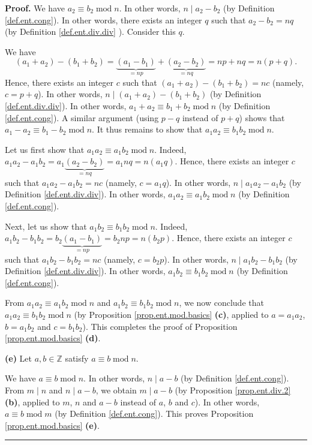 \documentclass[numbers=enddot,12pt,final,onecolumn,notitlepage]{scrartcl}%
\numberwithin{exer}{subsection}
\theoremstyle{definition}
\newenvironment{proof}[1][Proof]{\noindent\textbf{#1.} }{\ \rule{0.5em}{0.5em}}
\begin{document}
\begin{proof}
We have $a_{2}\equiv b_{2}\operatorname{mod}n$. In other words, $n\mid
a_{2}-b_{2}$ (by Definition \ref{def.ent.cong}). In other words, there exists
an integer $q$ such that $a_{2}-b_{2}=nq$ (by Definition \ref{def.ent.div.div}%
). Consider this $q$.

We have%
\[
\left(  a_{1}+a_{2}\right)  -\left(  b_{1}+b_{2}\right)  =\underbrace{\left(
a_{1}-b_{1}\right)  }_{=np}+\underbrace{\left(  a_{2}-b_{2}\right)  }%
_{=nq}=np+nq=n\left(  p+q\right)  .
\]
Hence, there exists an integer $c$ such that $\left(  a_{1}+a_{2}\right)
-\left(  b_{1}+b_{2}\right)  =nc$ (namely, $c=p+q$). In other words,
$n\mid\left(  a_{1}+a_{2}\right)  -\left(  b_{1}+b_{2}\right)  $ (by
Definition \ref{def.ent.div.div}). In other words, $a_{1}+a_{2}\equiv
b_{1}+b_{2}\operatorname{mod}n$ (by Definition \ref{def.ent.cong}). A similar
argument (using $p-q$ instead of $p+q$) shows that $a_{1}-a_{2}\equiv
b_{1}-b_{2}\operatorname{mod}n$. It thus remains to show that $a_{1}%
a_{2}\equiv b_{1}b_{2}\operatorname{mod}n$.

Let us first show that $a_{1}a_{2}\equiv a_{1}b_{2}\operatorname{mod}n$.
Indeed, $a_{1}a_{2}-a_{1}b_{2}=a_{1}\underbrace{\left(  a_{2}-b_{2}\right)
}_{=nq}=a_{1}nq=n\left(  a_{1}q\right)  $. Hence, there exists an integer $c$
such that $a_{1}a_{2}-a_{1}b_{2}=nc$ (namely, $c=a_{1}q$). In other words,
$n\mid a_{1}a_{2}-a_{1}b_{2}$ (by Definition \ref{def.ent.div.div}). In other
words, $a_{1}a_{2}\equiv a_{1}b_{2}\operatorname{mod}n$ (by Definition
\ref{def.ent.cong}).

Next, let us show that $a_{1}b_{2}\equiv b_{1}b_{2}\operatorname{mod}n$.
Indeed, $a_{1}b_{2}-b_{1}b_{2}=b_{2}\underbrace{\left(  a_{1}-b_{1}\right)
}_{=np}=b_{2}np=n\left(  b_{2}p\right)  $. Hence, there exists an integer $c$
such that $a_{1}b_{2}-b_{1}b_{2}=nc$ (namely, $c=b_{2}p$). In other words,
$n\mid a_{1}b_{2}-b_{1}b_{2}$ (by Definition \ref{def.ent.div.div}). In other
words, $a_{1}b_{2}\equiv b_{1}b_{2}\operatorname{mod}n$ (by Definition
\ref{def.ent.cong}).

From $a_{1}a_{2}\equiv a_{1}b_{2}\operatorname{mod}n$ and $a_{1}b_{2}\equiv
b_{1}b_{2}\operatorname{mod}n$, we now conclude that $a_{1}a_{2}\equiv
b_{1}b_{2}\operatorname{mod}n$ (by Proposition \ref{prop.ent.mod.basics}
\textbf{(c)}, applied to $a=a_{1}a_{2}$, $b=a_{1}b_{2}$ and $c=b_{1}b_{2}$).
This completes the proof of Proposition \ref{prop.ent.mod.basics} \textbf{(d)}.

\textbf{(e)} Let $a,b\in\mathbb{Z}$ satisfy $a\equiv b\operatorname{mod}n$.

We have $a\equiv b\operatorname{mod}n$. In other words, $n\mid a-b$ (by
Definition \ref{def.ent.cong}). From $m\mid n$ and $n\mid a-b$, we obtain
$m\mid a-b$ (by Proposition \ref{prop.ent.div.2} \textbf{(b)}, applied to $m$,
$n$ and $a-b$ instead of $a$, $b$ and $c$). In other words, $a\equiv
b\operatorname{mod}m$ (by Definition \ref{def.ent.cong}). This proves
Proposition \ref{prop.ent.mod.basics} \textbf{(e)}.
\end{proof}
\end{document}
